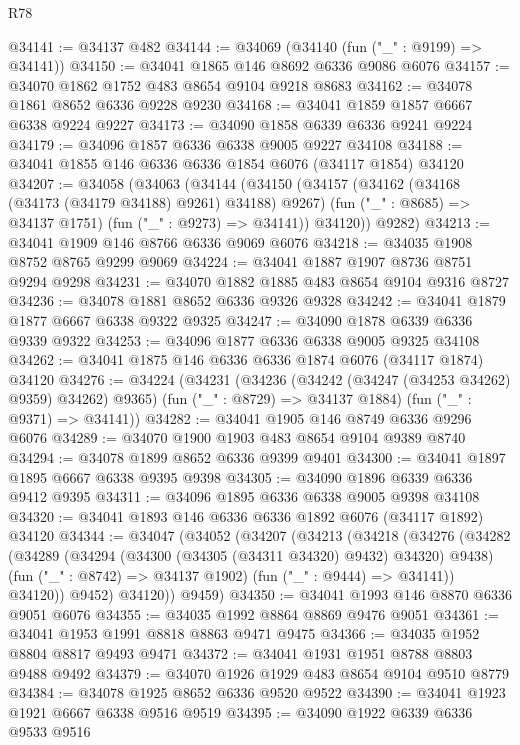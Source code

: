 \begin{lexlean}{R78}
\begin{coremodule}
@34141 := @34137 @482
@34144 := @34069 (@34140 (fun ("_" : @9199) => @34141))
@34150 := @34041 @1865 @146 @8692 @6336 @9086 @6076
@34157 := @34070 @1862 @1752 @483 @8654 @9104 @9218 @8683
@34162 := @34078 @1861 @8652 @6336 @9228 @9230
@34168 := @34041 @1859 @1857 @6667 @6338 @9224 @9227
@34173 := @34090 @1858 @6339 @6336 @9241 @9224
@34179 := @34096 @1857 @6336 @6338 @9005 @9227 @34108
@34188 := @34041 @1855 @146 @6336 @6336 @1854 @6076 (@34117 @1854) @34120
@34207 := @34058
    (@34063
      (@34144
        (@34150
          (@34157
            (@34162 (@34168 (@34173 (@34179 @34188) @9261) @34188) @9267)
            (fun ("_" : @8685) => @34137 @1751)
            (fun ("_" : @9273) => @34141))
          @34120))
      @9282)
@34213 := @34041 @1909 @146 @8766 @6336 @9069 @6076
@34218 := @34035 @1908 @8752 @8765 @9299 @9069
@34224 := @34041 @1887 @1907 @8736 @8751 @9294 @9298
@34231 := @34070 @1882 @1885 @483 @8654 @9104 @9316 @8727
@34236 := @34078 @1881 @8652 @6336 @9326 @9328
@34242 := @34041 @1879 @1877 @6667 @6338 @9322 @9325
@34247 := @34090 @1878 @6339 @6336 @9339 @9322
@34253 := @34096 @1877 @6336 @6338 @9005 @9325 @34108
@34262 := @34041 @1875 @146 @6336 @6336 @1874 @6076 (@34117 @1874) @34120
@34276 := @34224
    (@34231
      (@34236 (@34242 (@34247 (@34253 @34262) @9359) @34262) @9365)
      (fun ("_" : @8729) => @34137 @1884)
      (fun ("_" : @9371) => @34141))
@34282 := @34041 @1905 @146 @8749 @6336 @9296 @6076
@34289 := @34070 @1900 @1903 @483 @8654 @9104 @9389 @8740
@34294 := @34078 @1899 @8652 @6336 @9399 @9401
@34300 := @34041 @1897 @1895 @6667 @6338 @9395 @9398
@34305 := @34090 @1896 @6339 @6336 @9412 @9395
@34311 := @34096 @1895 @6336 @6338 @9005 @9398 @34108
@34320 := @34041 @1893 @146 @6336 @6336 @1892 @6076 (@34117 @1892) @34120
@34344 := @34047
    (@34052
      (@34207
        (@34213
          (@34218
            (@34276
              (@34282
                (@34289
                  (@34294 (@34300 (@34305 (@34311 @34320) @9432) @34320) @9438)
                  (fun ("_" : @8742) => @34137 @1902)
                  (fun ("_" : @9444) => @34141))
                @34120))
            @9452)
          @34120))
      @9459)
@34350 := @34041 @1993 @146 @8870 @6336 @9051 @6076
@34355 := @34035 @1992 @8864 @8869 @9476 @9051
@34361 := @34041 @1953 @1991 @8818 @8863 @9471 @9475
@34366 := @34035 @1952 @8804 @8817 @9493 @9471
@34372 := @34041 @1931 @1951 @8788 @8803 @9488 @9492
@34379 := @34070 @1926 @1929 @483 @8654 @9104 @9510 @8779
@34384 := @34078 @1925 @8652 @6336 @9520 @9522
@34390 := @34041 @1923 @1921 @6667 @6338 @9516 @9519
@34395 := @34090 @1922 @6339 @6336 @9533 @9516

\end{coremodule}
\end{lexlean}
